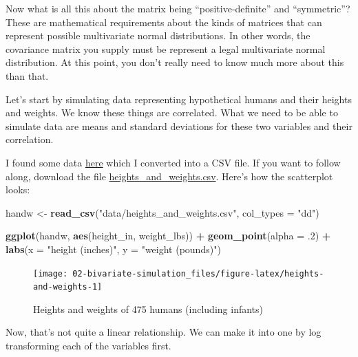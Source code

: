 \documentclass[]{book}
\newenvironment{Shaded}{\begin{snugshade}}{\end{snugshade}}
\newcommand{\DataTypeTok}[1]{\textcolor[rgb]{0.13,0.29,0.53}{#1}}
\newcommand{\FloatTok}[1]{\textcolor[rgb]{0.00,0.00,0.81}{#1}}
\newcommand{\KeywordTok}[1]{\textcolor[rgb]{0.13,0.29,0.53}{\textbf{#1}}}
\newcommand{\NormalTok}[1]{#1}
\newcommand{\OperatorTok}[1]{\textcolor[rgb]{0.81,0.36,0.00}{\textbf{#1}}}
\newcommand{\StringTok}[1]{\textcolor[rgb]{0.31,0.60,0.02}{#1}}
\begin{document}
Now what is all this about the matrix being ``positive-definite'' and ``symmetric''? These are mathematical requirements about the kinds of matrices that can represent possible multivariate normal distributions. In other words, the covariance matrix you supply must be represent a legal multivariate normal distribution. At this point, you don't really need to know much more about this than that.

Let's start by simulating data representing hypothetical humans and their heights and weights. We know these things are correlated. What we need to be able to simulate data are means and standard deviations for these two variables and their correlation.

I found some data \href{https://www.geogebra.org/m/RRprACv4}{here} which I converted into a CSV file. If you want to follow along, download the file \href{data/heights_and_weights.csv}{heights\_and\_weights.csv}. Here's how the scatterplot looks:

\begin{Shaded}
\begin{Highlighting}[]
\NormalTok{handw <-}\StringTok{ }\KeywordTok{read_csv}\NormalTok{(}\StringTok{"data/heights_and_weights.csv"}\NormalTok{, }\DataTypeTok{col_types =} \StringTok{"dd"}\NormalTok{)}

\KeywordTok{ggplot}\NormalTok{(handw, }\KeywordTok{aes}\NormalTok{(height_in, weight_lbs)) }\OperatorTok{+}\StringTok{ }
\StringTok{  }\KeywordTok{geom_point}\NormalTok{(}\DataTypeTok{alpha =} \FloatTok{.2}\NormalTok{) }\OperatorTok{+}
\StringTok{  }\KeywordTok{labs}\NormalTok{(}\DataTypeTok{x =} \StringTok{"height (inches)"}\NormalTok{, }\DataTypeTok{y =} \StringTok{"weight (pounds)"}\NormalTok{) }
\end{Highlighting}
\end{Shaded}

\begin{figure}

{\centering \texttt{[image: 02-bivariate-simulation\_files/figure-latex/heights-and-weights-1]} 

}

\caption{Heights and weights of 475 humans (including infants)}\label{fig:heights-and-weights}
\end{figure}

Now, that's not quite a linear relationship. We can make it into one by log transforming each of the variables first.

\begin{Shaded}
\end{Shaded}
\end{document}
